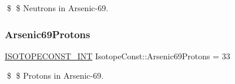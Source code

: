 \$ \$ Neutrons in Arsenic-\/69. \mbox{\label{group___isotope_const-_arsenic-_as69_ga61f88af4a247636101be67acc9fea228}} 
\subsubsection{\texorpdfstring{Arsenic69\+Protons}{Arsenic69Protons}}
{\footnotesize\ttfamily \mbox{\hyperlink{group___isotope_const-_macros_ga5f18360b3e99483a35c32d789e62621c}{I\+S\+O\+T\+O\+P\+E\+C\+O\+N\+S\+T\+\_\+\+I\+NT}} Isotope\+Const\+::\+Arsenic69\+Protons = 33}

\$ \$ Protons in Arsenic-\/69. 
